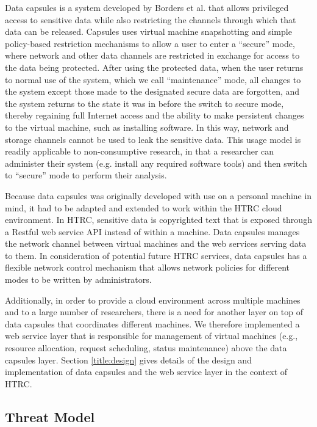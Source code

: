 \documentclass{acm_proc_article-sp}
\begin{document}
Data capsules is a system developed by Borders et al.
\cite{Borders:2009:PCD:1855768.1855791} that allows privileged access to
sensitive data while also restricting the channels through which that data can
be released.  Capsules uses virtual machine snapshotting and simple
policy-based restriction mechanisms to allow a user to enter a ``secure'' mode,
where network and other data channels are restricted in exchange for access to
the data being protected.  After using the protected data, when the user
returns to normal use of the system, which we call ``maintenance'' mode, all
changes to the system except those made to the designated secure data are
forgotten, and the system returns to the state it was in before the switch to
secure mode, thereby regaining full Internet access and the ability to make
persistent changes to the virtual machine, such as installing software.  In
this way, network and storage channels cannot be used to leak the sensitive
data.  This usage model is readily applicable to non-consumptive research, in
that a researcher can administer their system (e.g. install any required
software tools) and then switch to ``secure'' mode to perform their analysis.  

Because data capsules was originally developed with use on a personal
machine in mind, it had to be adapted and extended to work within the HTRC
cloud environment. In HTRC, sensitive data is copyrighted text that is exposed
through a Restful web service API instead of within a machine. Data capsules
manages the network channel between virtual machines and the web services
serving data to them. In consideration of potential future HTRC services,
data capsules has a flexible network control mechanism that allows network
policies for different modes to be written by administrators. 

Additionally, in order to provide a cloud environment across multiple machines
and to a large number of researchers, there is a need for another layer on top
of data capsules that coordinates different machines. We therefore
implemented a web service layer that is responsible for management of virtual
machines (e.g., resource allocation, request scheduling, status maintenance)
above the data capsules layer.  Section \ref{title:design} gives details of
the design and implementation of data capsules and the web service layer in
the context of HTRC.

\subsection{Threat Model}
\end{document}

